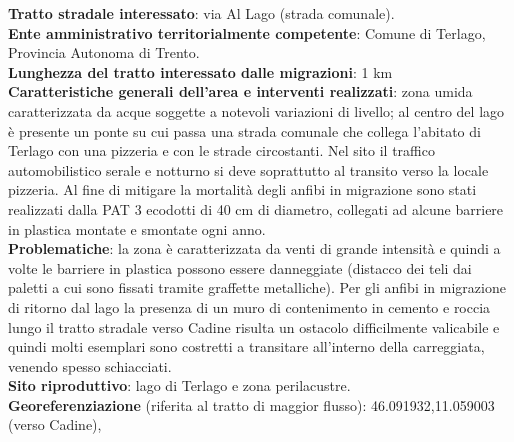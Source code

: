 \documentclass[11pt,a4paper,twoside]{memoir}
\begin{document}
\textbf{Tratto stradale interessato}: via Al Lago (strada comunale). \\
\textbf{Ente amministrativo territorialmente competente}: Comune di Terlago, Provincia Autonoma di Trento. \\
\textbf{Lunghezza del tratto interessato dalle migrazioni}: 1 km \\
\textbf{Caratteristiche generali dell’area e interventi realizzati}: zona umida caratterizzata da acque soggette a notevoli variazioni di livello; al centro del lago è presente un ponte su cui passa una strada comunale che collega l'abitato di Terlago con una pizzeria e con le strade circostanti. Nel sito il traffico automobilistico serale e notturno si deve soprattutto al transito verso la locale pizzeria. Al fine di mitigare la mortalità degli anfibi in migrazione sono stati realizzati dalla PAT 3 ecodotti di 40 cm di diametro, collegati ad alcune barriere in plastica montate e smontate ogni anno. \\
\textbf{Problematiche}: la zona è caratterizzata da venti di grande intensità e quindi a volte le barriere in plastica possono essere danneggiate (distacco dei teli dai paletti a cui sono fissati tramite graffette metalliche). Per gli anfibi in migrazione di ritorno dal lago la presenza di un muro di contenimento in cemento e roccia lungo il tratto stradale verso Cadine risulta un ostacolo difficilmente valicabile e quindi molti esemplari sono costretti a transitare all'interno della carreggiata, venendo spesso schiacciati. \\
\textbf{Sito riproduttivo}: lago di Terlago e zona perilacustre. \\
\textbf{Georeferenziazione} (riferita al tratto di maggior flusso): 46.091932,11.059003 (verso Cadine), 
\end{document}
